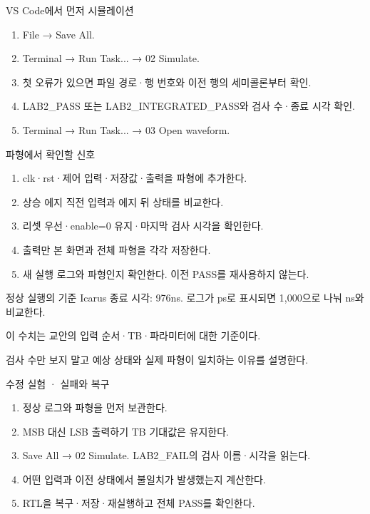 \begin{frame}[label=simulation]{VS Code에서 먼저 시뮬레이션}
\small
\begin{enumerate}
\item File → Save All.
\item Terminal → Run Task... → 02 Simulate.
\item 첫 오류가 있으면 파일 경로·행 번호와 이전 행의 세미콜론부터 확인.
\item LAB2\_PASS 또는 LAB2\_INTEGRATED\_PASS와 검사 수·종료 시각 확인.
\item Terminal → Run Task... → 03 Open waveform.
\end{enumerate}
\end{frame}

\begin{frame}{파형에서 확인할 신호}
\small
\begin{enumerate}
\item clk·rst·제어 입력·저장값·출력을 파형에 추가한다.
\item 상승 에지 직전 입력과 에지 뒤 상태를 비교한다.
\item 리셋 우선·enable=0 유지·마지막 검사 시각을 확인한다.
\item 출력만 본 화면과 전체 파형을 각각 저장한다.
\item 새 실행 로그와 파형인지 확인한다. 이전 PASS를 재사용하지 않는다.
\end{enumerate}
\end{frame}

\begin{frame}{정상 실행의 기준}
\small
{}Icarus 종료 시각: 976ns. 로그가 ps로 표시되면 1,000으로 나눠 ns와 비교한다.\par\vspace{0.26cm}이 수치는 교안의 입력 순서·TB·파라미터에 대한 기준이다.\par\vspace{0.26cm}검사 수만 보지 말고 예상 상태와 실제 파형이 일치하는 이유를 설명한다.\par
\end{frame}

\begin{frame}{수정 실험 · 실패와 복구}
\small
\begin{enumerate}
\item 정상 로그와 파형을 먼저 보관한다.
\item MSB 대신 LSB 출력하기 TB 기대값은 유지한다.
\item Save All → 02 Simulate. LAB2\_FAIL의 검사 이름·시각을 읽는다.
\item 어떤 입력과 이전 상태에서 불일치가 발생했는지 계산한다.
\item RTL을 복구·저장·재실행하고 전체 PASS를 확인한다.
\end{enumerate}
\end{frame}

